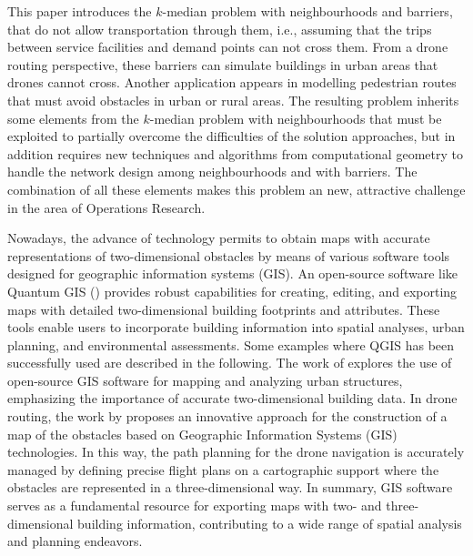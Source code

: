\documentclass[a4paper,  review, authoryear, 1p.]{elsarticle}
\newcommand{\JP}[1]{{\color{armygreen}#1}}
\newcommand{\CV}[1]{{\color{blue}#1}}
\begin{document}
	\JP{This paper introduces the $k$-median problem with neighbourhoods and barriers, that do not allow transportation through them, i.e.}, assuming that the trips between service facilities and demand points can not cross them. \CV{From a drone routing perspective}, these barriers can simulate buildings in urban areas that drones cannot cross. \JP{Another application appears in modelling  pedestrian routes that  must avoid obstacles in urban or rural areas}. \JP{The resulting problem inherits some elements from the $k$-median problem with neighbourhoods that must be exploited to partially overcome the difficulties of the solution approaches, but in addition requires new techniques and algorithms  from computational geometry to handle the network design among neighbourhoods and with barriers. The combination of all these elements makes this problem an new, attractive challenge  in the area of Operations Research. }
	
		
	\CV{
		Nowadays, the advance of technology permits to obtain maps with accurate representations of two-dimensional obstacles by means of various software tools designed for geographic information systems (GIS). An open-source software like Quantum GIS (\cite{qgisdevelopmentteam2009}) provides robust capabilities for creating, editing, and exporting maps with detailed two-dimensional building footprints and attributes. These tools enable users to incorporate building information into spatial analyses, urban planning, and environmental assessments. Some examples where QGIS has been successfully used are described in the following. The work of \cite{arsanjani2013} explores the use of open-source GIS software for mapping and analyzing urban structures, emphasizing the importance of accurate two-dimensional building data. In drone routing, the work by \cite{mangiameli2013} proposes an innovative approach for the construction of a map of the obstacles based on Geographic Information Systems (GIS) technologies. In this way, the path planning for the drone navigation is accurately managed by defining precise flight plans on a cartographic support where the obstacles are represented in a three-dimensional way. In summary, GIS software serves as a fundamental resource for exporting maps with two- and three-dimensional building information, contributing to a wide range of spatial analysis and planning endeavors.}
		
\end{document}
